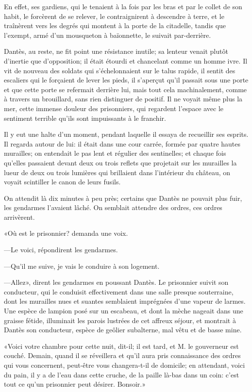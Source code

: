 En effet, ses gardiens, qui le tenaient à la fois par les bras et par le collet de son habit, le forcèrent de se relever, le contraignirent à descendre à terre, et le traînèrent vers les degrés qui montent à la porte de la citadelle, tandis que l'exempt, armé d'un mousqueton à baïonnette, le suivait par-derrière.

Dantès, au reste, ne fit point une résistance inutile; sa lenteur venait plutôt d'inertie que d'opposition; il était étourdi et chancelant comme un homme ivre. Il vit de nouveau des soldats qui s'échelonnaient sur le talus rapide, il sentit des escaliers qui le forçaient de lever les pieds, il s'aperçut qu'il passait sous une porte et que cette porte se refermait derrière lui, mais tout cela machinalement, comme à travers un brouillard, sans rien distinguer de positif. Il ne voyait même plus la mer, cette immense douleur des prisonniers, qui regardent l'espace avec le sentiment terrible qu'ils sont impuissants à le franchir.

Il y eut une halte d'un moment, pendant laquelle il essaya de recueillir ses esprits. Il regarda autour de lui: il était dans une cour carrée, formée par quatre hautes murailles; on entendait le pas lent et régulier des sentinelles; et chaque fois qu'elles passaient devant deux ou trois reflets que projetait sur les murailles la lueur de deux ou trois lumières qui brillaient dans l'intérieur du château, on voyait scintiller le canon de leurs fusils.

On attendit là dix minutes à peu près; certains que Dantès ne pouvait plus fuir, les gendarmes l'avaient lâché. On semblait attendre des ordres, ces ordres arrivèrent.

«Où est le prisonnier? demanda une voix.

—Le voici, répondirent les gendarmes.

—Qu'il me suive, je vais le conduire à son logement.

—Allez», dirent les gendarmes en poussant Dantès. Le prisonnier suivit son conducteur, qui le conduisit effectivement dans une salle presque souterraine, dont les murailles nues et suantes semblaient imprégnées d'une vapeur de larmes. Une espèce de lampion posé sur un escabeau, et dont la mèche nageait dans une graisse fétide, illuminait les parois lustrées de cet affreux séjour, et montrait à Dantès son conducteur, espèce de geôlier subalterne, mal vêtu et de basse mine.

«Voici votre chambre pour cette nuit, dit-il; il est tard, et M. le gouverneur est couché. Demain, quand il se réveillera et qu'il aura pris connaissance des ordres qui vous concernent, peut-être vous changera-t-il de domicile; en attendant, voici du pain, il y a de l'eau dans cette cruche, de la paille là-bas dans un coin: c'est tout ce qu'un prisonnier peut désirer. Bonsoir.»

